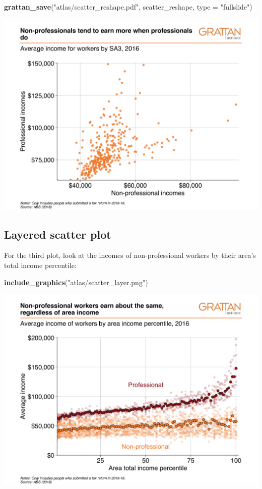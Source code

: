 \documentclass[
]{book}
\newenvironment{Shaded}{\begin{snugshade}}{\end{snugshade}}
\newcommand{\DataTypeTok}[1]{\textcolor[rgb]{0.13,0.29,0.53}{#1}}
\newcommand{\KeywordTok}[1]{\textcolor[rgb]{0.13,0.29,0.53}{\textbf{#1}}}
\newcommand{\NormalTok}[1]{#1}
\newcommand{\StringTok}[1]{\textcolor[rgb]{0.31,0.60,0.02}{#1}}
\begin{document}
\begin{Shaded}
\begin{Highlighting}[]
\KeywordTok{grattan\_save}\NormalTok{(}\StringTok{"atlas/scatter\_reshape.pdf"}\NormalTok{, scatter\_reshape, }\DataTypeTok{type =} \StringTok{"fullslide"}\NormalTok{)}
\end{Highlighting}
\end{Shaded}

\includegraphics[width=44.44in]{atlas/scatter_reshape}

\hypertarget{layered-scatter-plot}{%
\subsection{Layered scatter plot}\label{layered-scatter-plot}}

For the third plot, look at the incomes of non-professional workers by their area's total income percentile:

\begin{Shaded}
\begin{Highlighting}[]
\KeywordTok{include\_graphics}\NormalTok{(}\StringTok{"atlas/scatter\_layer.png"}\NormalTok{)}
\end{Highlighting}
\end{Shaded}

\includegraphics[width=44.44in]{atlas/scatter_layer}
\end{document}
